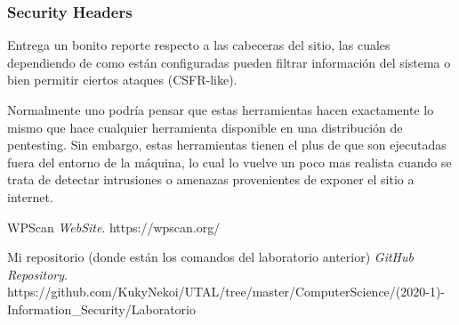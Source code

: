 \documentclass[11pt]{utalcaDoc}
\begin{document}
\subsubsection{Security Headers}
Entrega un bonito reporte respecto a las cabeceras del sitio, las cuales dependiendo de como están configuradas pueden filtrar información del sistema o bien permitir ciertos ataques (CSFR-like).
\newline

Normalmente uno podría pensar que estas herramientas hacen exactamente lo mismo que hace cualquier herramienta disponible en una distribución de pentesting. Sin embargo, estas herramientas tienen el plus de que son ejecutadas fuera del entorno de la máquina, lo cual lo vuelve un poco mas realista cuando se trata de detectar intrusiones o amenazas provenientes de exponer el sitio a internet.

\begin{thebibliography}{9}
	WPScan
	\textit{WebSite}.
	https://wpscan.org/

	Mi repositorio (donde están los comandos del laboratorio anterior)
	\textit{GitHub Repository}.
	https://github.com/KukyNekoi/UTAL/tree/master/ComputerScience/(2020-1)-Information_Security/Laboratorio%
\end{thebibliography}
\end{document}
